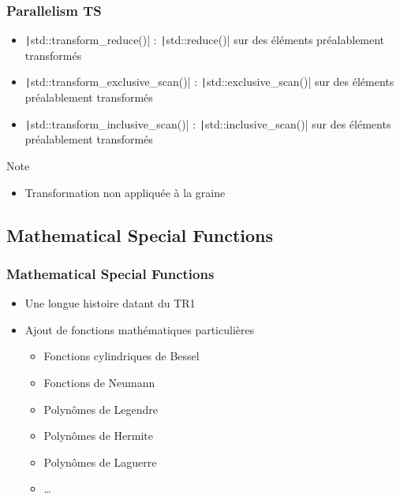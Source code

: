 \documentclass[C++.tex]{subfiles}
\begin{document}
\begin{frame}[fragile]
	\frametitle{Parallelism TS}
	\begin{itemize}
		\item \texttt|std::transform_reduce()| : \texttt|std::reduce()| sur des éléments préalablement transformés
		\item \texttt|std::transform_exclusive_scan()| : \texttt|std::exclusive_scan()| sur des éléments préalablement transformés
		\item \texttt|std::transform_inclusive_scan()| : \texttt|std::inclusive_scan()| sur des éléments préalablement transformés
	\end{itemize}

	\begin{block}{Note}
		\begin{itemize}
			\item Transformation non appliquée à la graine
		\end{itemize}
	\end{block}

\end{frame}

\subsection*{Mathematical Special Functions}
\begin{frame}[fragile]
	\frametitle{Mathematical Special Functions}
	\begin{itemize}
		\item Une longue histoire datant du TR1
		\item Ajout de fonctions mathématiques particulières
		\begin{itemize}
			\item Fonctions cylindriques de Bessel
			\item Fonctions de Neumann
			\item Polynômes de Legendre
			\item Polynômes de Hermite
			\item Polynômes de Laguerre
			\item \ldots{}
		\end{itemize}
	\end{itemize}

\end{frame}
\end{document}
